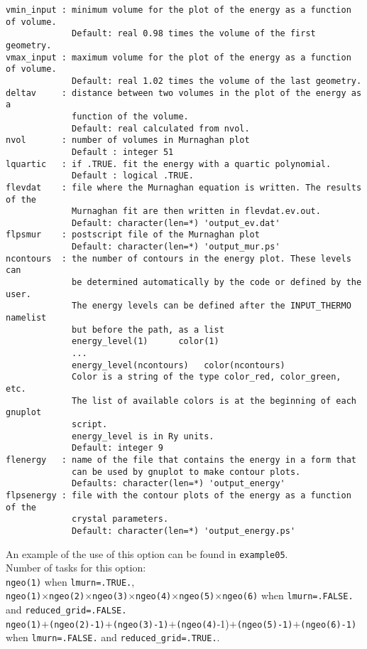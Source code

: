\documentclass[12pt,a4paper]{article}
\begin{document}
\begin{verbatim}
vmin_input : minimum volume for the plot of the energy as a function of volume.
             Default: real 0.98 times the volume of the first geometry.
vmax_input : maximum volume for the plot of the energy as a function of volume.
             Default: real 1.02 times the volume of the last geometry.
deltav     : distance between two volumes in the plot of the energy as a 
             function of the volume.
             Default: real calculated from nvol.
nvol       : number of volumes in Murnaghan plot
             Default : integer 51
lquartic   : if .TRUE. fit the energy with a quartic polynomial.
             Default : logical .TRUE.
flevdat    : file where the Murnaghan equation is written. The results of the
             Murnaghan fit are then written in flevdat.ev.out.
             Default: character(len=*) 'output_ev.dat'
flpsmur    : postscript file of the Murnaghan plot
             Default: character(len=*) 'output_mur.ps'
ncontours  : the number of contours in the energy plot. These levels can
             be determined automatically by the code or defined by the user.
             The energy levels can be defined after the INPUT_THERMO namelist 
             but before the path, as a list
             energy_level(1)      color(1)
             ...
             energy_level(ncontours)   color(ncontours) 
             Color is a string of the type color_red, color_green, etc.
             The list of available colors is at the beginning of each gnuplot
             script.
             energy_level is in Ry units.
             Default: integer 9
flenergy   : name of the file that contains the energy in a form that
             can be used by gnuplot to make contour plots.
             Defaults: character(len=*) 'output_energy'
flpsenergy : file with the contour plots of the energy as a function of the
             crystal parameters.
             Default: character(len=*) 'output_energy.ps'
\end{verbatim}
An example of the use of this option can be found in \texttt{example05}.\\
Number of tasks for this option: \\
\texttt{ngeo(1)} when \texttt{lmurn=.TRUE.}, \\
\texttt{ngeo(1)}$\times$\texttt{ngeo(2)}$\times$\texttt{ngeo(3)}$\times$\texttt{ngeo(4)}$\times$\texttt{ngeo(5)}$\times$\texttt{ngeo(6)} when 
\texttt{lmurn=.FALSE.} and \texttt{reduced\_grid=.FALSE.}\\
\texttt{ngeo(1)}$+$\texttt{(ngeo(2)-1)}$+$\texttt{(ngeo(3)-1)}$+$\texttt{(ngeo(4)}-1)$+$\texttt{(ngeo(5)-1)}$+$\texttt{(ngeo(6)-1)} when 
\texttt{lmurn=.FALSE.} and \texttt{reduced\_grid=.TRUE.}.
\end{document}
